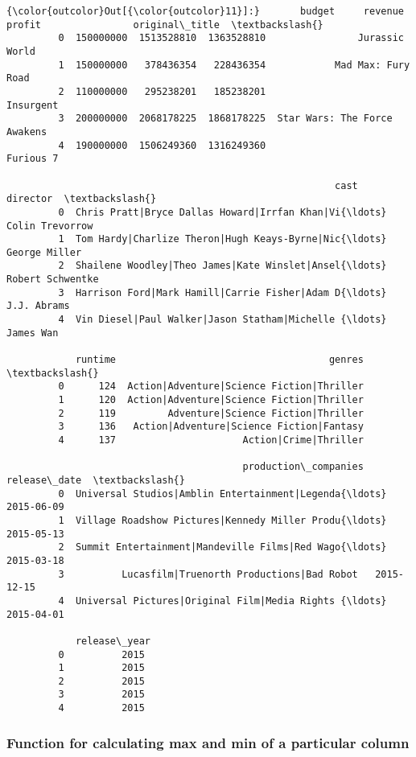 \documentclass[11pt]{article}
\begin{document}
\begin{Verbatim}[commandchars=\\\{\}]
{\color{outcolor}Out[{\color{outcolor}11}]:}       budget     revenue      profit                original\_title  \textbackslash{}
         0  150000000  1513528810  1363528810                Jurassic World   
         1  150000000   378436354   228436354            Mad Max: Fury Road   
         2  110000000   295238201   185238201                     Insurgent   
         3  200000000  2068178225  1868178225  Star Wars: The Force Awakens   
         4  190000000  1506249360  1316249360                     Furious 7   
         
                                                         cast          director  \textbackslash{}
         0  Chris Pratt|Bryce Dallas Howard|Irrfan Khan|Vi{\ldots}   Colin Trevorrow   
         1  Tom Hardy|Charlize Theron|Hugh Keays-Byrne|Nic{\ldots}     George Miller   
         2  Shailene Woodley|Theo James|Kate Winslet|Ansel{\ldots}  Robert Schwentke   
         3  Harrison Ford|Mark Hamill|Carrie Fisher|Adam D{\ldots}       J.J. Abrams   
         4  Vin Diesel|Paul Walker|Jason Statham|Michelle {\ldots}         James Wan   
         
            runtime                                     genres  \textbackslash{}
         0      124  Action|Adventure|Science Fiction|Thriller   
         1      120  Action|Adventure|Science Fiction|Thriller   
         2      119         Adventure|Science Fiction|Thriller   
         3      136   Action|Adventure|Science Fiction|Fantasy   
         4      137                      Action|Crime|Thriller   
         
                                         production\_companies release\_date  \textbackslash{}
         0  Universal Studios|Amblin Entertainment|Legenda{\ldots}   2015-06-09   
         1  Village Roadshow Pictures|Kennedy Miller Produ{\ldots}   2015-05-13   
         2  Summit Entertainment|Mandeville Films|Red Wago{\ldots}   2015-03-18   
         3          Lucasfilm|Truenorth Productions|Bad Robot   2015-12-15   
         4  Universal Pictures|Original Film|Media Rights {\ldots}   2015-04-01   
         
            release\_year  
         0          2015  
         1          2015  
         2          2015  
         3          2015  
         4          2015  
\end{Verbatim}
            
    \subsubsection{Function for calculating max and min of a particular
column}\label{function-for-calculating-max-and-min-of-a-particular-column}
\end{document}
